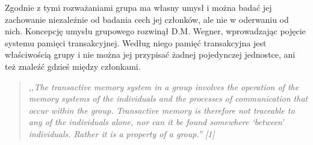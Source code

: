 Zgodnie z tymi rozważaniami grupa ma własny umysł i można badać jej zachowanie niezależnie 
od badania cech jej członków, ale nie w oderwaniu od nich. Koncepcję umysłu grupowego rozwinął 
D.M. Wegner, wprowadzając pojęcie systemu pamięci transakcyjnej. Według niego pamięć transakcyjna 
jest właściwością grupy i nie można jej przypisać  żadnej pojedynczej jednostce, ani też znaleźć 
gdzieś między członkami.

\begin{quote}\em
,,The transactive memory system in a group involves the operation of the 
memory systems of the individuals and the processes of communication that occur 
within the group. Transactive memory is therefore not traceable to any of the 
individuals alone, nor can it be found somewhere `between' individuals. Rather 
it is a property of a group.'' [1]
\end{quote}

